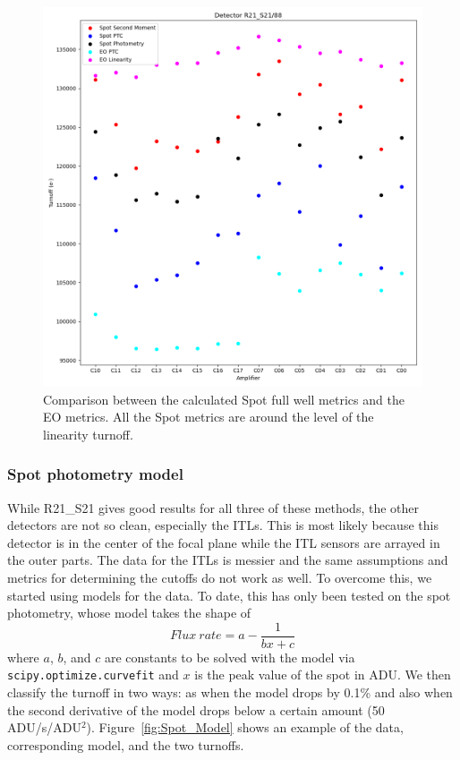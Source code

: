 \begin{figure}[ht]
    \centering
    \includegraphics[width=0.95\linewidth]{figures/Spot_EO_Comparison.png}
    \caption{Comparison between the calculated Spot full well metrics and the EO metrics. All the Spot metrics are around the level of the linearity turnoff.}
    \label{fig:Spot_vs_EO_Metrics}
\end{figure}

\subsubsection{Spot photometry model}

While R21\_S21 gives good results for all three of these methods, the other detectors are not so clean, especially the ITLs. This is most likely because this detector is in the center of the focal plane while the ITL sensors are arrayed in the outer parts. 
The data for the ITLs is messier and the same assumptions and metrics for determining the cutoffs do not work as well. To overcome this, we started using models for the data. To date, this has only been tested on the spot photometry, whose model takes the shape of
\begin{equation*}
    Flux \ rate=a-\frac{1}{bx+c}
\end{equation*}
where $a$, $b$, and $c$ are constants to be solved with the model via \texttt{scipy.optimize.curvefit} and $x$ is the peak value of the spot in ADU. We then classify the turnoff in two ways: as when the model drops by 0.1\% and also when the second derivative of the model drops below a certain amount (50 ADU/s/ADU$^{2}$). Figure~\ref{fig:Spot_Model} shows an example of the data, corresponding model, and the two turnoffs.

